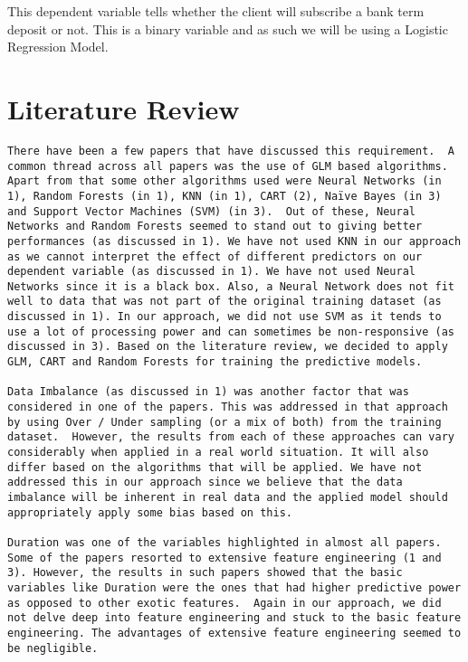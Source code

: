 \documentclass[english,floatsintext,man]{apa6}
\begin{document}
This dependent variable tells whether the client will subscribe a bank
term deposit or not. This is a binary variable and as such we will be
using a Logistic Regression Model.

\section{Literature Review}\label{literature-review}

\begin{verbatim}
There have been a few papers that have discussed this requirement.  A common thread across all papers was the use of GLM based algorithms.  Apart from that some other algorithms used were Neural Networks (in 1), Random Forests (in 1), KNN (in 1), CART (2), Naïve Bayes (in 3) and Support Vector Machines (SVM) (in 3).  Out of these, Neural Networks and Random Forests seemed to stand out to giving better performances (as discussed in 1). We have not used KNN in our approach as we cannot interpret the effect of different predictors on our dependent variable (as discussed in 1). We have not used Neural Networks since it is a black box. Also, a Neural Network does not fit well to data that was not part of the original training dataset (as discussed in 1). In our approach, we did not use SVM as it tends to use a lot of processing power and can sometimes be non-responsive (as discussed in 3). Based on the literature review, we decided to apply GLM, CART and Random Forests for training the predictive models. 

Data Imbalance (as discussed in 1) was another factor that was considered in one of the papers. This was addressed in that approach by using Over / Under sampling (or a mix of both) from the training dataset.  However, the results from each of these approaches can vary considerably when applied in a real world situation. It will also differ based on the algorithms that will be applied. We have not addressed this in our approach since we believe that the data imbalance will be inherent in real data and the applied model should appropriately apply some bias based on this. 

Duration was one of the variables highlighted in almost all papers. Some of the papers resorted to extensive feature engineering (1 and 3). However, the results in such papers showed that the basic variables like Duration were the ones that had higher predictive power as opposed to other exotic features.  Again in our approach, we did not delve deep into feature engineering and stuck to the basic feature engineering. The advantages of extensive feature engineering seemed to be negligible.
\end{verbatim}
\end{document}
